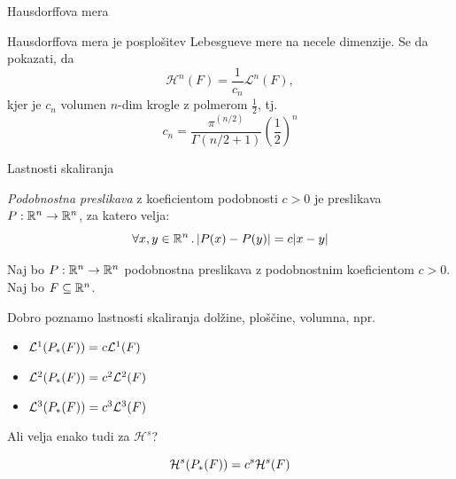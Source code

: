 \documentclass[10pt]{beamer}
\begin{document}
\begin{frame}[t]{Hausdorffova mera}
    \begin{opomba}
        Hausdorffova mera je posplošitev Lebesgueve mere na necele dimenzije. Se da pokazati, da 
        \[\mathcal{H}^n(F) = \frac{1}{c_n} \mathcal{L}^n(F),\]
        kjer je \(c_n\) volumen \(n\)-dim krogle z polmerom \(\frac{1}{2}\), tj. 
        \[c_n = \frac{\pi^{(n/2)}}{\Gamma(n/2 + 1)} \left(\frac{1}{2}\right)^n\]
    \end{opomba}  
\end{frame}

\begin{frame}[t]{Lastnosti skaliranja}
     {
        \begin{definicija}
            \emph{Podobnostna preslikava} z koeficientom podobnosti \(c > 0\) je preslikava \(P: \mathbb{R}^n \to \mathbb{R}^n\), za katero velja:
            \[\forall x, y \in \mathbb{R}^n \,.\, |P(x) - P(y)| = c|x-y|\]
        \end{definicija}
    }
    \pause
    Naj bo \(P: \mathbb{R}^n \to \mathbb{R}^n\) podobnostna preslikava z podobnostnim koeficientom \(c > 0\). Naj bo \(F \subseteq \mathbb{R}^n\).
    
     {
        Dobro poznamo lastnosti skaliranja dolžine, ploščine, volumna, npr.
        \begin{itemize}
            \item \(\mathcal{L}^1(P_{*}(F)) = c \mathcal{L}^1(F)\)
            \item \(\mathcal{L}^2(P_{*}(F)) = c^2 \mathcal{L}^2(F)\)
            \item \(\mathcal{L}^3(P_{*}(F)) = c^3 \mathcal{L}^3(F)\)
        \end{itemize}
        Ali velja enako tudi za \(\mathcal{H}^s\)?
    }
    \pause
    \begin{trditev}
        \[\mathcal{H}^s(P_{*}(F)) = c^s \mathcal{H}^s(F)\]
    \end{trditev}   
\end{frame}

    
\end{document}
